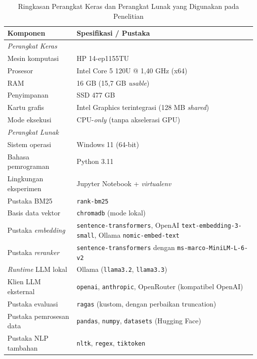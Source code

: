 \begin{table}[H]
\centering
\caption{Ringkasan Perangkat Keras dan Perangkat Lunak yang Digunakan pada Penelitian}
\label{tbl:spesifikasi-implementasi}
\begin{tabular}{|p{4.6cm}|p{8.4cm}|}
\hline
\textbf{Komponen} & \textbf{Spesifikasi / Pustaka} \\ \hline
\multicolumn{2}{|l|}{\textit{Perangkat Keras}} \\ \hline
Mesin komputasi          & HP 14-ep1155TU \\ \hline
Prosesor                 & Intel Core 5 120U @ 1{,}40 GHz (x64) \\ \hline
RAM                      & 16 GB (15{,}7 GB \textit{usable}) \\ \hline
Penyimpanan              & SSD 477 GB \\ \hline
Kartu grafis             & Intel Graphics terintegrasi (128 MB \textit{shared}) \\ \hline
Mode eksekusi            & CPU-\textit{only} (tanpa akselerasi GPU) \\ \hline
\multicolumn{2}{|l|}{\textit{Perangkat Lunak}} \\ \hline
Sistem operasi           & Windows 11 (64-bit) \\ \hline
Bahasa pemrograman       & Python 3.11 \\ \hline
Lingkungan eksperimen    & Jupyter Notebook + \textit{virtualenv} \\ \hline
Pustaka BM25             & \texttt{rank-bm25} \\ \hline
Basis data vektor        & \texttt{chromadb} (mode lokal) \\ \hline
Pustaka \textit{embedding}   & \texttt{sentence-transformers}, OpenAI \texttt{text-embedding-3-small}, Ollama \texttt{nomic-embed-text} \\ \hline
Pustaka \textit{reranker}    & \texttt{sentence-transformers} dengan \texttt{ms-marco-MiniLM-L-6-v2} \\ \hline
\textit{Runtime} LLM lokal   & Ollama (\texttt{llama3.2}, \texttt{llama3.3}) \\ \hline
Klien LLM eksternal      & \texttt{openai}, \texttt{anthropic}, OpenRouter (kompatibel OpenAI) \\ \hline
Pustaka evaluasi         & \texttt{ragas} (kustom, dengan perbaikan truncation) \\ \hline
Pustaka pemrosesan data  & \texttt{pandas}, \texttt{numpy}, \texttt{datasets} (Hugging Face) \\ \hline
Pustaka NLP tambahan     & \texttt{nltk}, \texttt{regex}, \texttt{tiktoken} \\ \hline
\end{tabular}
\end{table}

